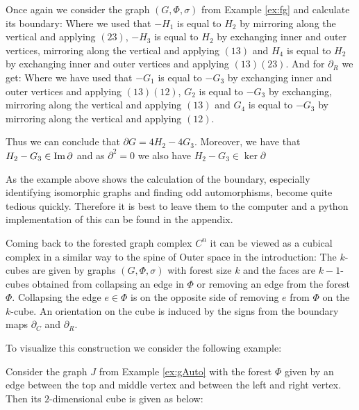 \begin{eg}
	Once again we consider the graph $(G,\Phi,\sigma)$ from Example \ref{ex:fg} and calculate its boundary:
	Where we used that $-H_{1}$ is equal to $H_{2}$ by mirroring along the vertical and applying $(2 3)$,
	$-H_{3}$ is equal to $H_2$ by exchanging inner and outer vertices, mirroring along the vertical and applying $(1 3)$ and
	$H_{4}$ is equal to $H_{2}$ by exchanging inner and outer vertices and applying $(1 3)(2 3)$.
	And for $\partial_R$ we get:
	Where we have used that $-G_{1}$ is equal to $-G_{3}$ by exchanging inner and outer vertices and applying $(1 3)(1 2)$,
	$G_{2}$ is equal to $-G_{3}$ by exchanging, mirroring along the vertical and applying $(1 3)$ and
	$G_{4}$ is equal to $-G_{3}$ by mirroring along the vertical and applying $(1 2)$. 

	Thus we can conclude that $\partial G = 4 H_2 - 4 G_3$. Moreover, we have that $H_2 - G_3 \in \operatorname{Im} \partial$ and 
	as $\partial^2=0$ we also have $H_2 - G_3 \in \ker \partial$
\end{eg}

\begin{remark}
As the example above shows the calculation of the boundary, especially identifying isomorphic graphs and finding odd automorphisms, 
become quite tedious quickly. Therefore it is best to leave them to the computer and a python implementation
of this can be found in the appendix.
\end{remark}

Coming back to the forested graph complex $C^{n}$ it can be viewed as a cubical complex in a similar way to the spine of Outer space in the introduction:
The $k$-cubes are given by graphs $(G,\Phi,\sigma)$
with forest size $k$ and the faces are $k-1$-cubes obtained from collapsing an edge in $\Phi$ 
or removing an edge from the forest $\Phi$. Collapsing the edge $e \in \Phi$ is
on the opposite side of removing $e$ from $\Phi$ on the $k$-cube.
An orientation on the cube is induced by the signs from the boundary maps $\partial_{C}$ and $\partial_{R}$.

To visualize this construction we consider the following example:
\begin{eg}
	Consider the graph $J$ from Example \ref{ex:gAuto} with the forest $\Phi$ given by an edge between the top and middle vertex and
	between the left and right vertex.
	Then its $2$-dimensional cube is given as below:
\end{eg}
\newpage
